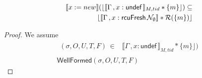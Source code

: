   \begin{lemma}
   \label{lemma:alloc}
\begin{align*}
  \llbracket x:=new \rrbracket (\lfloor \llbracket \Gamma\, , x:\textsf{undef} \, \rrbracket_{M,tid} * \{m\}\rfloor)  \subseteq \\
                                                              \lfloor \llbracket \Gamma\,,  x:\textsf{rcuFresh} \, \mathcal{N}_{\emptyset}  \rrbracket  * \mathcal{R}(\{m\})\rfloor
\end{align*}
 \end{lemma}
 \begin{proof}
We assume
\begin{gather}\label{ahu1alc}
  \begin{aligned}
    (\sigma, O, U, T,F) \, \in &  \llbracket \Gamma\, , x:\textsf{undef} \, \rrbracket_{M,tid} * \{m\}\rfloor) 
    \end{aligned} \\
\textsf{WellFormed}(\sigma,O,U,T,F)
\label{ahu2alc}
\end{gather}


\end{proof}
